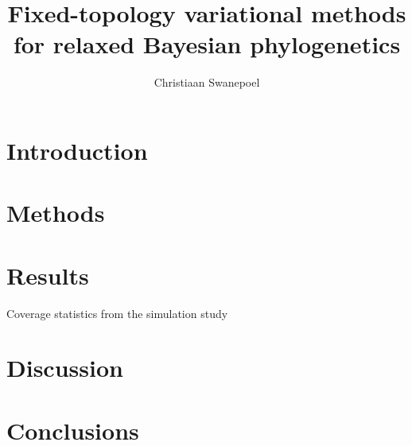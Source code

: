 \documentclass{article}
\title{Fixed-topology variational methods for relaxed Bayesian phylogenetics}
\author{Christiaan Swanepoel}
\begin{document}
\maketitle
\section*{Introduction}

\section*{Methods}

\section*{Results}

\begin{table}

\caption{Coverage statistics from the simulation study}
\label{tab:coverage}
\end{table}

\section*{Discussion}

\section*{Conclusions}
\end{document}
